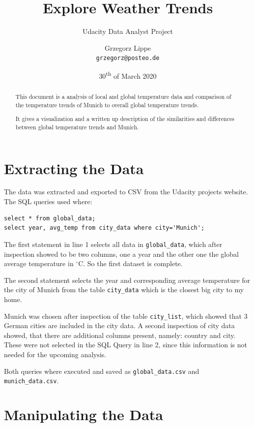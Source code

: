 \documentclass[DIV=11, a4paper, parskip=true]{scrartcl}
\author{Grzegorz Lippe\\
{\small \texttt{grzegorz@posteo.de}}}
\title{Explore Weather Trends}
\subtitle{Udacity Data Analyst Project}
\date{30\textsuperscript{th} of March 2020}
\begin{document}
\maketitle

\begin{abstract}
This document is a analysis of local and global temperature data and comparison of
the temperature trends of Munich to overall global temperature trends.

It gives a visualization and a written up description of the similarities and differences
between global temperature trends and Munich.
\end{abstract}

\tableofcontents

\pagebreak
\section{Extracting the Data}
The data was extracted and exported to CSV from the Udacity projects website. The SQL queries
used where:

\lstset{language=SQL, basicstyle=\ttm, numbers=left}
\begin{lstlisting}[caption=SQL queries]
select * from global_data;
select year, avg_temp from city_data where city='Munich';
\end{lstlisting}

The first statement in line 1 selects all data in \texttt{global\_data}, which after inspection
showed to be two columns, one a year and the other one the global average temperature in
$^\circ$C. So the first dataset is complete.

The second statement selects the year and corresponding average temperature for the city of
Munich from the table \texttt{city\_data} which is the closest big city to my home.

Munich was chosen after inspection of the table \texttt{city\_list}, which showed that 3
German cities are included in the city data. A second inspection of city data showed, that
there are additional columns present, namely: country and city. These were not selected in
the SQL Query in line 2, since this information is not needed for the upcoming analysis.

Both queries where executed and saved as \texttt{global\_data.csv} and
\texttt{munich\_data.csv}.

\pagebreak
\section{Manipulating the Data}
\end{document}

